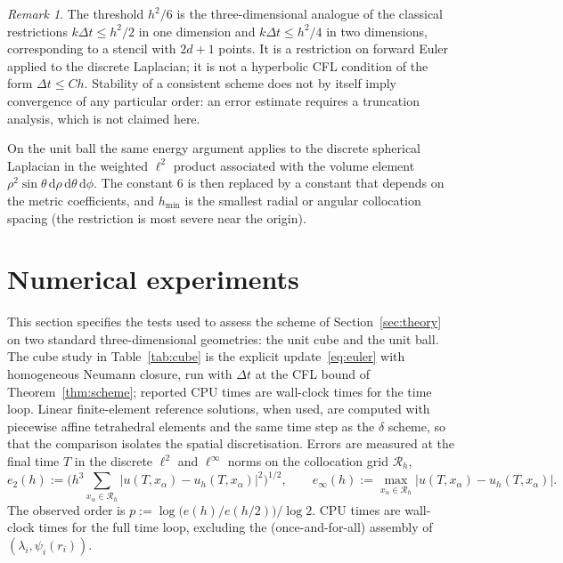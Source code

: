 \documentclass[final,3p,times]{elsarticle}
\theoremstyle{plain}
\theoremstyle{definition}
\theoremstyle{remark}
\newtheorem{remark}[theorem]{Remark}
\newcommand{\dziti}{\ensuremath{\delta}\text{-Ziti}}
\newcommand{\dd}{\mathrm{d}}
\begin{document}
\begin{remark}
The threshold $h^2/6$ is the three-dimensional analogue of the classical
restrictions $k\Delta t\le h^2/2$ in one dimension and
$k\Delta t\le h^2/4$ in two dimensions, corresponding to a stencil with
$2d+1$ points. It is a restriction on forward Euler applied to the discrete
Laplacian; it is not a hyperbolic CFL condition of the form
$\Delta t\le C h$. Stability of a consistent scheme does not by itself imply
convergence of any particular order: an error estimate requires a truncation
analysis, which is not claimed here.

On the unit ball the same energy argument applies to the discrete spherical
Laplacian in the weighted $\ell^2$ product associated with the volume element
$\rho^2\sin\theta\,\dd\rho\,\dd\theta\,\dd\phi$. The constant $6$ is then
replaced by a constant that depends on the metric coefficients, and
$h_{\min}$ is the smallest radial or angular collocation spacing (the
restriction is most severe near the origin).
\end{remark}

\section{Numerical experiments}
\label{sec:numerics}

This section specifies the tests used to assess the scheme of
Section~\ref{sec:theory} on two standard three-dimensional geometries: the
unit cube and the unit ball. The cube study in Table~\ref{tab:cube} is the
explicit update~\eqref{eq:euler} with homogeneous Neumann closure, run with
$\Delta t$ at the CFL bound of Theorem~\ref{thm:scheme}; reported CPU times
are wall-clock times for the time loop. Linear finite-element reference
solutions, when used, are computed with piecewise affine tetrahedral elements
and the same time step as the \dziti{} scheme, so that the comparison
isolates the spatial discretisation. Errors are measured at the final time
$T$ in the discrete $\ell^2$ and $\ell^\infty$ norms on the collocation grid
$\mathcal{R}_h$,
\begin{equation}
\label{eq:errors}
e_2(h):=\Biggl(h^3\sum_{x_\alpha\in\mathcal{R}_h}
\bigl\lvert u(T,x_\alpha)-u_h(T,x_\alpha)\bigr\rvert^2\Biggr)^{1/2},
\qquad
e_\infty(h):=\max_{x_\alpha\in\mathcal{R}_h}
\bigl\lvert u(T,x_\alpha)-u_h(T,x_\alpha)\bigr\rvert.
\end{equation}
The observed order is
$p:=\log\bigl(e(h)/e(h/2)\bigr)/\log 2$. CPU times are wall-clock times for
the full time loop, excluding the (once-and-for-all) assembly of
$(\lambda_i,\psi_i(r_i))$.
\end{document}
